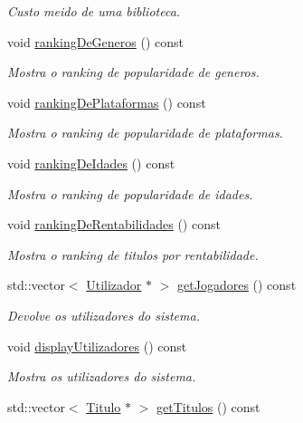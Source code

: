 \begin{DoxyCompactItemize}
\begin{DoxyCompactList}\small\item\em Custo meido de uma biblioteca. \end{DoxyCompactList}\item 
void \mbox{\hyperlink{class_sistema_afc03af6008df8639b1d1878388f70886}{ranking\+De\+Generos}} () const
\begin{DoxyCompactList}\small\item\em Mostra o ranking de popularidade de generos. \end{DoxyCompactList}\item 
void \mbox{\hyperlink{class_sistema_a6e4c08a6ee3c8f5721e46f64823fd6a3}{ranking\+De\+Plataformas}} () const
\begin{DoxyCompactList}\small\item\em Mostra o ranking de popularidade de plataformas. \end{DoxyCompactList}\item 
void \mbox{\hyperlink{class_sistema_a922993ab8f9dd2e8eb853edf3172543b}{ranking\+De\+Idades}} () const
\begin{DoxyCompactList}\small\item\em Mostra o ranking de popularidade de idades. \end{DoxyCompactList}\item 
void \mbox{\hyperlink{class_sistema_a6fb78c2cafbf5b6703d126ef43ba43f0}{ranking\+De\+Rentabilidades}} () const
\begin{DoxyCompactList}\small\item\em Mostra o ranking de titulos por rentabilidade. \end{DoxyCompactList}\item 
std\+::vector$<$ \mbox{\hyperlink{class_utilizador}{Utilizador}} $\ast$ $>$ \mbox{\hyperlink{class_sistema_acb9f4d8c3ee7d1a24f8784c379f660df}{get\+Jogadores}} () const
\begin{DoxyCompactList}\small\item\em Devolve os utilizadores do sistema. \end{DoxyCompactList}\item 
void \mbox{\hyperlink{class_sistema_ac22188d7bcfb9df24776d67900b9d7fb}{display\+Utilizadores}} () const
\begin{DoxyCompactList}\small\item\em Mostra os utilizadores do sistema. \end{DoxyCompactList}\item 
std\+::vector$<$ \mbox{\hyperlink{class_titulo}{Titulo}} $\ast$ $>$ \mbox{\hyperlink{class_sistema_af870153af417f47e9ef1d53fdadffa3a}{get\+Titulos}} () const

\end{DoxyCompactItemize}

